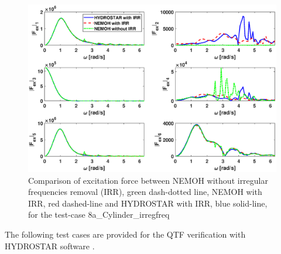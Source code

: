 \documentclass[12pt,a4paper,titlepage]{article}
\begin{document}
\begin{itemize}
\begin{figure}[h!tbp]
\includegraphics[scale=0.5,trim = 10mm 0mm 30mm 0mm, clip]{figures/Cylinder/excForce.eps}

\caption{Comparison of excitation force between NEMOH without irregular frequencies removal (IRR), green dash-dotted line, NEMOH with IRR, red dashed-line and HYDROSTAR with IRR, blue solid-line, for the test-case 8a\_Cylinder\_irregfreq}\label{fig:Cylinder_IRR_excforce}
\end{figure}

\end{itemize}

\FloatBarrier

The following test cases are provided for the QTF verification with HYDROSTAR software \cite{HYDROSTAR}.
\end{document}
